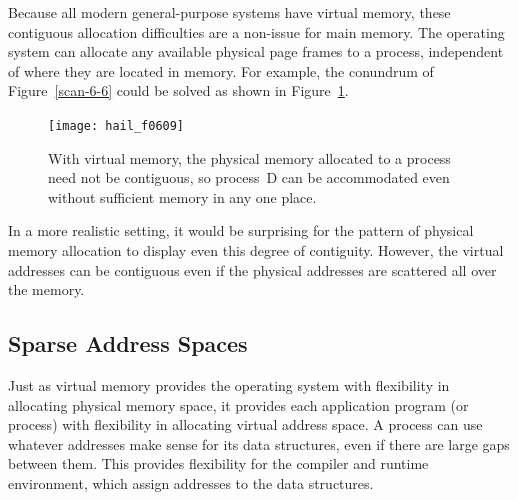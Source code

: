 Because all modern general-purpose systems have virtual memory, these
contiguous allocation difficulties are a non-issue for main memory.
The operating system can allocate any available physical page frames
to a process, independent of where they are located in memory. 
For example, the conundrum of
Figure~\ref{scan-6-6} could be solved as shown in
Figure~\ref{discontiguous}.
\begin{figure}
\centerline{\texttt{[image: hail\_f0609]}}
\caption{With virtual memory, the physical memory allocated to a
  process need not be contiguous, so process~D can be accommodated even
  without sufficient memory in any one place.}
\label{discontiguous}
\end{figure}
In a more realistic setting, it would be
surprising for the pattern of physical memory allocation to display
even this degree of contiguity.  However, the
virtual addresses can be contiguous even if the physical addresses
are scattered all over the memory. 

\subsection{Sparse Address Spaces}

Just as virtual memory provides the operating system with flexibility
in allocating physical memory space, it provides each application
program (or process) with flexibility in allocating virtual address
space.  A process can use whatever addresses make sense for its data
structures, even if there are large gaps between them.  This provides
flexibility for the compiler and runtime environment, which assign
addresses to the data structures.

